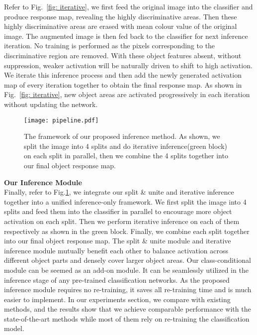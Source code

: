 \documentclass[10pt,twocolumn,letterpaper]{article}
\begin{document}
Refer to Fig.~\ref{fig: iterative}, we first feed the original image into the classifier and produce response map,
revealing 
the highly discriminative areas.
Then these highly discriminative areas are erased with mean colour value of the original image. 
The augmented image is then fed back to the classifier for next
inference iteration. 
No training is performed
as the pixels corresponding to the discriminative region are
removed. With these object features absent, without suppression,
weaker activation will be naturally driven to shift to high activation.
We iterate this inference process and then add the newly generated activation map of every iteration together to obtain the final response map.
As shown in Fig.~\ref{fig: iterative}, new object areas are activated progressively in each iteration without updating the network. 
\begin{figure}[t!]
   \begin{center}
   {\texttt{[image: pipeline.pdf]}}
   \end{center}
\caption{The framework of our proposed inference method.
As shown, we split the image into 4 splits and do iterative inference(green block) on each split in parallel, then we combine the 4 splits together into our final object response map.
}
\vspace{-2mm}
   \label{fig: framework}
\end{figure}

\noindent\textbf{Our Inference Module}\\
Finally, refer to Fig.\ref{fig: framework}, we integrate our split \& unite and iterative inference together into a unified inference-only framework.
We first split the image into 4 splits and feed them into the classifier in parallel to encourage more object activation on each split.
Then we perform iterative inference on each of them respectively
as shown in the green block.
Finally, we combine each split together into our final object response map. 
The split \& unite module and iterative inference module mutually benefit each other to balance
activation across different object parts and densely cover larger object areas. 
Our class-conditional module can be seemed as an add-on module.
It can be seamlessly utilized in the inference stage of any pre-trained classification networks.
As the proposed inference module requires no re-training, it saves all re-training time and is much easier to implement. 
In our experiments section, we compare with existing methods, and the results show that we achieve comparable performance with the
state-of-the-art methods while most of them
rely on re-training the classification model.
\end{document}
